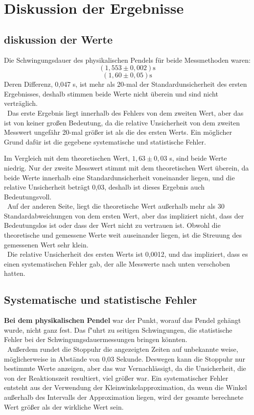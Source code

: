 \documentclass[11pt,a4paper]{article} %
\begin{document}
\section{Diskussion der Ergebnisse}
\subsection{diskussion der Werte}
Die Schwingungsdauer des physikalischen Pendels für beide Messmethoden waren:
$$(1,553 \pm 0,002) \textrm{s}$$
$$(1,60 \pm 0,05) \textrm{s}$$
Deren Differenz, 0,047 s, ist mehr als 20-mal der Standardunsicherheit des ersten Ergebnisses, deshalb stimmen beide Werte nicht überein und sind nicht verträglich. 
\\\
Das erste Ergebnis liegt innerhalb des Fehlers von dem zweiten Wert, aber das ist von keiner großen Bedeutung, da die relative Unsicherheit von dem zweiten Messwert ungefähr 20-mal größer ist als die des ersten Werts. Ein möglicher Grund dafür ist die gegebene systematische und statistische Fehler. 

Im Vergleich mit dem theoretischen Wert, $1,63 \pm 0,03$ s, sind beide Werte niedrig. Nur der zweite Messwert stimmt mit dem theoretischen Wert überein, da beide Werte innerhalb eine Standardunsicherheit voneinander liegen, und die relative Unsicherheit beträgt 0,03, deshalb ist dieses Ergebnis auch Bedeutungsvoll. 
\\\
Auf der anderen Seite, liegt die theoretische Wert außerhalb mehr als 30 Standardabweichungen von dem ersten Wert, aber das impliziert nicht, dass der Bedeutungslos ist oder dass der Wert nicht zu vertrauen ist. Obwohl die theoretische und gemessene Werte weit auseinander liegen, ist die Streuung des gemessenen Wert sehr klein. 
\\\
Die relative Unsicherheit des ersten Werts ist 0,0012, und das impliziert, dass es einen systematischen Fehler gab, der alle Messwerte nach unten verschoben hatten. 

\subsection{Systematische und statistische Fehler}
\textbf{Bei dem physikalischen Pendel} war der Punkt, worauf das Pendel gehängt wurde, nicht ganz fest. Das f"uhrt zu seitigen Schwingungen, die  statistische Fehler bei der Schwingungsdauermessungen bringen könnten. 
\\\
Außerdem rundet die Stoppuhr die angezeigten Zeiten auf unbekannte weise, möglicherweise in Abstände von 0,03 Sekunde. Deswegen kann die Stoppuhr nur bestimmte Werte anzeigen, aber das war Vernachlässigt, da die Unsicherheit, die von der Reaktionszeit resultiert, viel größer war. 
Ein systematischer Fehler entsteht aus der Verwendung der Kleinwinkelapproximation, da wenn die Winkel außerhalb des Intervalls der Approximation liegen, wird der gesamte berechnete Wert größer als der wirkliche Wert sein.
\end{document}

